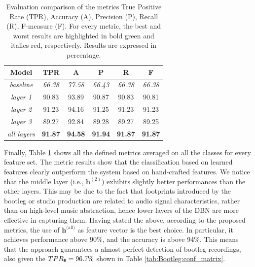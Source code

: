 \begin{table}[t!]
\vspace{5pt}
\caption{Evaluation comparison of the metrics True Positive Rate (TPR), Accuracy (A), Precision (P), Recall (R), F-measure (F). For every metric, the best and worst results are highlighted in bold green and italics red, respectively. Results are expressed in percentage.}
\label{tab:Bootleg:metrics}
\centering
\bgroup
\def\arraystretch{1.5}
\begin{tabular}{||c|c|c|c|c|c||}
\hline
\hline
\textbf{Model} & \textbf{TPR} & \textbf{A} & \textbf{P} & \textbf{R} & \textbf{F} \\ 
\hline
\hline
\textit{baseline} \cite{Bestagini2013b}   & {\color[HTML]{8E0000} \textit{66.38}} & {\color[HTML]{8E0000} \textit{77.58}} & {\color[HTML]{8E0000} \textit{66.43}} & {\color[HTML]{8E0000} \textit{66.38}} & {\color[HTML]{8E0000} \textit{66.38}} \\
\hline
\textit{layer 1}    & 90.83                                 & 93.89                                 & 90.87                                 & 90.83                                 & 90.81                                 \\
\textit{layer 2}    & 91.23                                 & 94.16                                 & 91.25                                 & 91.23                                 & 91.23                                 \\
\textit{layer 3}    & 89.27                                 & 92.84                                 & 89.28                                 & 89.27                                 & 89.25                                 \\
\textit{all layers} & {\color[HTML]{326B00} \textbf{91.87}} & {\color[HTML]{326B00} \textbf{94.58}} & {\color[HTML]{326B00} \textbf{91.94}} & {\color[HTML]{326B00} \textbf{91.87}} & {\color[HTML]{326B00} \textbf{91.87}} \\ 
\hline
\hline
\end{tabular}
\egroup
\end{table}

Finally, Table \ref{tab:Bootleg:metrics} shows all the defined metrics averaged on all the classes for every feature set. The metric results show that the classification based on learned features clearly outperform the system based on hand-crafted features. We notice that the middle layer (i.e., $\mathbf{h}^{(2)}$) exhibits slightly better performances than the other layers.
This may be due to the fact that footprints introduced by the bootleg or studio production are related to audio signal characteristics, rather than on high-level music abstraction, hence lower layers of the DBN are more effective in capturing them. Having stated the above, according to the proposed metrics, the use of $\mathbf{h}^\text{(all)}$ as feature vector is the best choice. In particular, it achieves performance above 90\%, and the accuracy is above 94\%. This means that the approach guarantees a almost perfect detection of bootleg recordings, also given the $TPR_{\texttt{B}}=96.7 \%$ shown in Table \ref{tab:Bootleg:conf_matrix}.

